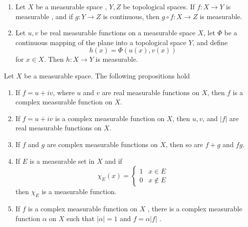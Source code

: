 \documentclass[../main.tex]{subfiles}
\begin{document}
\begin{lemma}{}{}
    \begin{enumerate}
        \item Let  \(  X  \) be a measurable space , \(  Y ,Z  \) be topological spaces. If \(  f:X\to Y  \) is measurable , and if  \(  g:Y\to Z  \) is continuous, then     \(  g\circ f :X\to Z  \) is measurable. 
        \item Let \(  u,v  \) be real measurable functions on a measurable space \(  X  \), let \(  \Phi   \) be a continuous mapping of the plane into a topological space \(  Y  \), and define \[
        h\left( x \right)=  \Phi \left( u\left( x \right),v\left( x \right)   \right)  
        \]for  \(  x \in X  \). Then  \(  h: X\to Y  \) is measurable.       
    \end{enumerate}
    
\end{lemma}
\begin{corollary}{}{}
    Let \(  X  \) be a measurable space. The following propositions hold
    \begin{enumerate}
        \item If \(  f =  u+ iv  \), where \(  u  \) and \(  v   \) are real measurable functions on \(  X  \), then \(  f   \) is a  complex measurable function on \(  X  \). 
        \item If \(  f= u+ iv  \) is a complex measurable function on \(  X  \), then \(  u,v  \), and \(  \left| f \right|   \) are real measurable functions on \(  X  \). 
        \item If \(  f  \) and \(  g  \) are complex measurable functions on \(  X  \), then so are \(  f+ g  \) and \(  fg  \).
        \item If \(  E  \) is a measurable set in \(  X  \) and if \[
        \chi _{E}\left( x \right)= \begin{cases} 1& x\in E\\ 
         0&x\not\in  E \end{cases}  
        \] then \(  \chi _{E}  \) is a measurable function.
        \item If \(  f  \) is a complex measurable function on \(  X  \) , there is a complex measurable function \(  \alpha   \) on \(  X  \) such that \(  \left| \alpha  \right|=  1   \)                         and \(  f= \alpha \left| f \right|   \) .  
    \end{enumerate}
     
    
\end{corollary}
\end{document}
